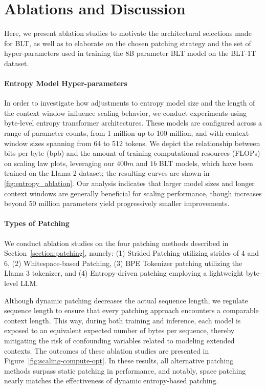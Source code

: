 \section{Ablations and Discussion}
\label{section:ablations}
Here, we present ablation studies to motivate the architectural selections made for {\textsc BLT}, as well as to elaborate on the chosen patching strategy and the set of hyper-parameters used in training the 8B parameter {\textsc BLT} model on the {\textsc BLT}-1T dataset.

\paragraph{Entropy Model Hyper-parameters} In order to investigate how adjustments to entropy model size and the length of the context window influence scaling behavior, we conduct experiments using byte-level entropy transformer architectures. These models are configured across a range of parameter counts, from 1 million up to 100 million, and with context window sizes spanning from 64 to 512 tokens. We depict the relationship between bits-per-byte (bpb) and the amount of training computational resources (FLOPs) on scaling law plots, leveraging our $400m$ and $1b$ {\textsc BLT} models, which have been trained on the Llama-2 dataset; the resulting curves are shown in \autoref{fig:entropy_ablation}. Our analysis indicates that larger model sizes and longer context windows are generally beneficial for scaling performance, though increases beyond 50 million parameters yield progressively smaller improvements.

\paragraph{Types of Patching}

We conduct ablation studies on the four patching methods described in Section~\ref{section:patching}, namely: (1) Strided Patching utilizing strides of 4 and 6, (2) Whitespace-based Patching, (3) BPE Tokenizer patching utilizing the Llama 3 tokenizer, and (4) Entropy-driven patching employing a lightweight byte-level LLM.

Although dynamic patching decreases the actual sequence length, we regulate sequence length to ensure that every patching approach encounters a comparable context length. This way, during both training and inference, each model is exposed to an equivalent expected number of bytes per sequence, thereby mitigating the risk of confounding variables related to modeling extended contexts. The outcomes of these ablation studies are presented in Figure~\ref{fig:scaling-compute-opt}. In these results, all alternative patching methods surpass static patching in performance, and notably, space patching nearly matches the effectiveness of dynamic entropy-based patching.

